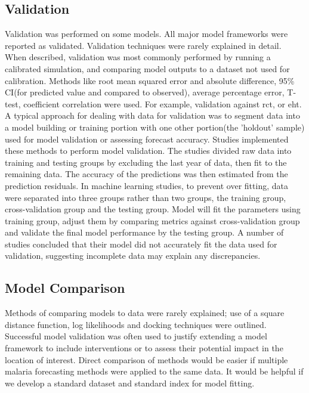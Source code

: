 \documentclass[a4paper, 12pt, twoside]{article}
\begin{document}
\subsection{Validation}%
\label{par:validation}
Validation was performed on some models.
All major model frameworks were reported as validated.
Validation techniques were rarely explained in detail.
When described, validation was most commonly performed by running a calibrated simulation, and comparing model outputs to a dataset not used for calibration.
Methods like root mean squared error and absolute difference\cite{Adimi2010, Rahman2011}, 95\% CI(for predicted value and compared to observed)\cite{Chatterjee2009,Gomez-Elipe2007,Roy2011}, average percentage error\cite{Haghdoost2008}, T-test\cite{Xiao2010}, coefficient correlation\cite{Yacob1947} were used.
For example, validation against \gls{rct}, or \gls{eht}.
A typical approach for dealing with data for validation was to segment data into a model building or training portion with one other portion(the 'holdout' sample) used for model validation or assessing forecast accuracy.
Studies\cite{Parveen2021,Rahman2011} implemented these methods to perform model validation.
The studies divided raw data into training and testing groups by excluding the last year of data, then fit to the remaining data.
The accuracy of the predictions was then estimated from the prediction residuals.
In machine learning studies, to prevent over fitting, data were separated into three groups rather than two groups, the training group, cross-validation group and the testing group.
Model will fit the parameters using training group, adjust them by comparing metrics against cross-validation group and validate the final model performance by the testing group.
A number of studies concluded that their model did not accurately fit the data used for validation, suggesting incomplete data may explain any discrepancies.

\subsection{Model Comparison}%
\label{par:comparing_models}
Methods of comparing models to data were rarely explained; use of a square distance function, log likelihoods and docking techniques were outlined.
Successful model validation was often used to justify extending a model framework to include interventions or to assess their potential impact in the location of interest.
Direct comparison of methods would be easier if multiple malaria forecasting methods were applied to the same data.
It would be helpful if we develop a standard dataset and standard index for model fitting.
\end{document}
